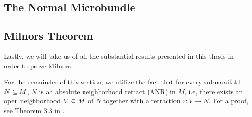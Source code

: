 \subsection*{The Normal Microbundle}\label{section::normal}


\subsection*{Milnors Theorem}\label{section::milnor}
\begin{myparagraph}
    Lastly, we will take us of all the substantial
    results presented in this thesis in order to prove Milnors .
\end{myparagraph}

\begin{myparagraph}
    For the remainder of this section,
    we utilize the fact that for every submanifold $N \subseteq{} M$,
    $N$ is an absolute neighborhood retract (ANR) in $M$,
    i.e, there exists an open neighborhood $V \subseteq{} M$ of $N$
    together with a retraction $r: V \to N$.
    For a proof, see Theorem 3.3 in \cite{hanner}.
    
\end{myparagraph}

